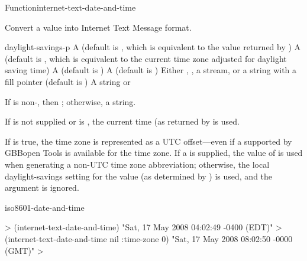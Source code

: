 \documentclass[10pt,twoside,english,pdftex]{article}
\begin{document}
\begin{functiondoc}{Function}{internet-text-date-and-time}{%
    }
% 

\fnsyntax

\fnpurpose Convert a  value into Internet Text Message format.

\fnpackage {}

\fnmodule {}

\fnargs
\begin{args}{daylight-savings-p}
 A  (default is \nil,
  which is equivalent to the value returned by
  )
 A  (default is \nil,
  which is equivalent to the current time zone adjusted for daylight
  saving time)
 A  (default is \nil)         A  (default is \nil)
\arg[destination] Either \nil, , a stream, or a string with a fill 
pointer (default is \nil)
\arg[result] A string or \nil{}
\end{args}

\fnreturns If  is non-\nil, then \nil; otherwise, a string.

\fndescription
{}%
%
If  is not supplied or is \nil, the current time
(as returned by  is used.

\W{} 
%
If  is true, the time zone is represented as a UTC
offset---even if a  supported by
GBBopen Tools is available for the time zone. If a  is
supplied, the value of  is used when
generating a non-UTC time zone abbreviation; otherwise, the local
daylight-savings setting for the  value (as
determined by ) is used, and the
 argument is ignored.

\begin{alsos}{iso8601-date-and-time}
\end{alsos}

\fnexamples
%
\W\supp
\begin{example}
  > (internet-text-date-and-time)
  "Sat, 17 May 2008 04:02:49 -0400 (EDT)"
  > (internet-text-date-and-time nil :time-zone 0)
  "Sat, 17 May 2008 08:02:50 -0000 (GMT)"
  >
\end{example}

\end{functiondoc}
\end{document}
